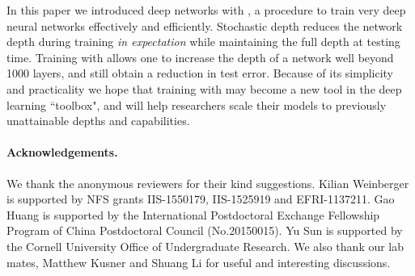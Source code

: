 \documentclass[runningheads]{llncs}
\begin{document}
\label{sec_conclusion}

In this paper we introduced deep networks with \emph{\name{}}, a procedure to train very deep neural networks effectively and efficiently. Stochastic depth reduces the network depth during training \emph{in expectation} while maintaining the full depth at testing time. Training with \name{} allows one to increase the depth of a network well beyond 1000 layers, and still obtain a reduction in test error. Because of its simplicity and practicality we hope that training with \name{} may become a new tool in the deep learning ``toolbox", and will help researchers scale their models to previously unattainable depths and capabilities.

\paragraph{\textbf{Acknowledgements.}} We thank the anonymous reviewers for their kind suggestions. Kilian Weinberger is supported by NFS grants IIS-1550179, IIS-1525919 and EFRI-1137211. Gao Huang is supported by the International Postdoctoral Exchange Fellowship Program of China Postdoctoral Council (No.20150015). Yu Sun is supported by the Cornell University Office of Undergraduate Research. We also thank our lab mates, Matthew Kusner and Shuang Li for useful and interesting discussions. 





\end{document}
